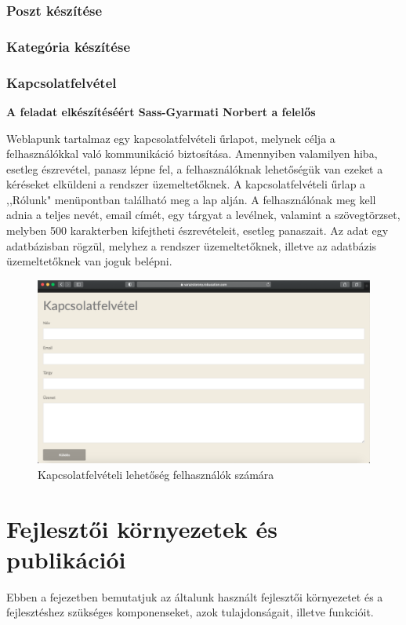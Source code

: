\documentclass[
]{thesis-ekf}
\theoremstyle{definition}
\theoremstyle{remark}
\begin{document}
		\subsection{Poszt készítése}
		\subsection{Kategória készítése}
		\subsection{Kapcsolatfelvétel}
			\par \textbf{A feladat elkészítéséért Sass-Gyarmati Norbert a felelős}
			\par Weblapunk tartalmaz egy kapcsolatfelvételi űrlapot, melynek célja a felhasználókkal való kommunikáció biztosítása. Amennyiben valamilyen hiba, esetleg észrevétel, panasz lépne fel, a felhasználóknak lehetőségük van ezeket a kéréseket elküldeni a rendszer üzemeltetőknek. A kapcsolatfelvételi űrlap a ,,Rólunk" menüpontban található meg a lap alján. A felhasználónak meg kell adnia a teljes nevét, email címét, egy tárgyat a levélnek, valamint a szövegtörzset, melyben 500 karakterben kifejtheti észrevételeit, esetleg panaszait. Az adat egy adatbázisban rögzül, melyhez a rendszer üzemeltetőknek, illetve az adatbázis üzemeltetőknek van joguk belépni.
			\begin{figure}[h]
				\centering
				\includegraphics[scale=0.30]{contactme}
				\caption{Kapcsolatfelvételi lehetőség felhasználók számára}
				\label{fig:contactme}
			\end{figure}

\chapter{Fejlesztői környezetek és publikációi}
	\par Ebben a fejezetben bemutatjuk az általunk használt fejlesztői környezetet és a fejlesztéshez szükséges komponenseket, azok tulajdonságait, illetve funkcióit.
\end{document}
